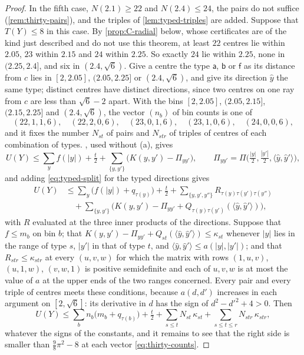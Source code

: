 \documentclass[11pt,reqno]{amsart}
\renewcommand{\_}{\origunderscore\allowbreak}
\numberwithin{equation}{section}
\theoremstyle{plain}
\theoremstyle{definition}
\theoremstyle{remark}
\begin{document}
\begin{proof}
In the fifth case, $N(2.1)\ge22$ and $N(2.4)\le24$, the pairs do not
suffice (\cref{rem:thirty-pairs}), and the triples of
\cref{lem:typed-triples} are added. Suppose that $T(Y)\le8$ in this case.
By \cref{prop:C-radial} below, whose certificates are of the kind just
described and do not use this theorem, at least $22$ centres lie within
$2.05$, $23$ within $2.15$ and $24$ within $2.25$. So exactly $24$ lie within
$2.25$, none in $(2.25,2.4]$, and six in $(2.4,\sqrt6)$. Give a centre the
type $\mathsf a$, $\mathsf b$ or $\mathsf f$ as its distance from $c$ lies in
$[2,2.05]$, $(2.05,2.25]$ or $(2.4,\sqrt6)$, and give its direction $\hat y$
the same type; distinct centres have distinct directions, since two centres
on one ray from $c$ are less than $\sqrt6-2$ apart. With the bins
$[2,2.05]$, $(2.05,2.15]$, $(2.15,2.25]$ and $(2.4,\sqrt6)$, the vector
$(n_b)$ of bin counts is one of
\begin{equation}\label{eq:thirty-counts}
  (22,1,1,6),\quad(22,2,0,6),\quad(23,0,1,6),\quad(23,1,0,6),\quad(24,0,0,6),
\end{equation}
and it fixes the number $N_{st}$ of pairs and $N_{str}$ of triples of
centres of each combination of types. ,
used without (a), gives
\[
  U(Y)\le\sum_yf(|y|)+\tfrac t2+\sum_{\{y,y'\}}\bigl(K(y,y')-\Pi_{yy'}\bigr),
  \qquad
  \Pi_{yy'}=\Pi\bigl(\tfrac{|y|}2,\tfrac{|y'|}2,\langle\hat y,\hat y'\rangle\bigr),
\]
and adding \eqref{eq:typed-split} for the typed directions gives
\begin{align*}
  U(Y)&\le\sum_y\bigl(f(|y|)+q_{\tau(y)}\bigr)+\tfrac t2
  +\sum_{\{y,y',y''\}}R_{\tau(y)\tau(y')\tau(y'')}\\
  &\quad+\sum_{\{y,y'\}}\bigl(K(y,y')-\Pi_{yy'}+Q_{\tau(y)\tau(y')}(\langle\hat y,\hat y'\rangle)\bigr),
\end{align*}
with $R$ evaluated at the three inner products of the directions. Suppose
that $f\le m_b$ on bin $b$; that
$K(y,y')-\Pi_{yy'}+Q_{st}(\langle\hat y,\hat y'\rangle)\le\kappa_{st}$
whenever $|y|$ lies in the range of type $s$, $|y'|$ in that of type $t$,
and $\langle\hat y,\hat y'\rangle\le a(|y|,|y'|)$; and that
$R_{str}\le\kappa_{str}$ at every $(u,v,w)$ for which the matrix with rows
$(1,u,v)$, $(u,1,w)$, $(v,w,1)$ is positive semidefinite and each of $u,v,w$
is at most the value of $a$ at the upper ends of the two ranges concerned.
Every pair and every triple of centres meets these conditions, because
$a(d,d')$ increases in each argument on $[2,\sqrt6]$: its derivative in $d$
has the sign of $d^2-d'^2+4>0$. Then
\begin{equation}\label{eq:thirty-bound}
  U(Y)\le\sum_bn_b\bigl(m_b+q_{\tau(b)}\bigr)+\tfrac t2
  +\sum_{s\le t}N_{st}\,\kappa_{st}+\sum_{s\le t\le r}N_{str}\,\kappa_{str},
\end{equation}
whatever the signs of the constants, and it remains to see that the right
side is smaller than $\frac98\pi^2-8$ at each vector \eqref{eq:thirty-counts}.


\end{proof}
\end{document}
